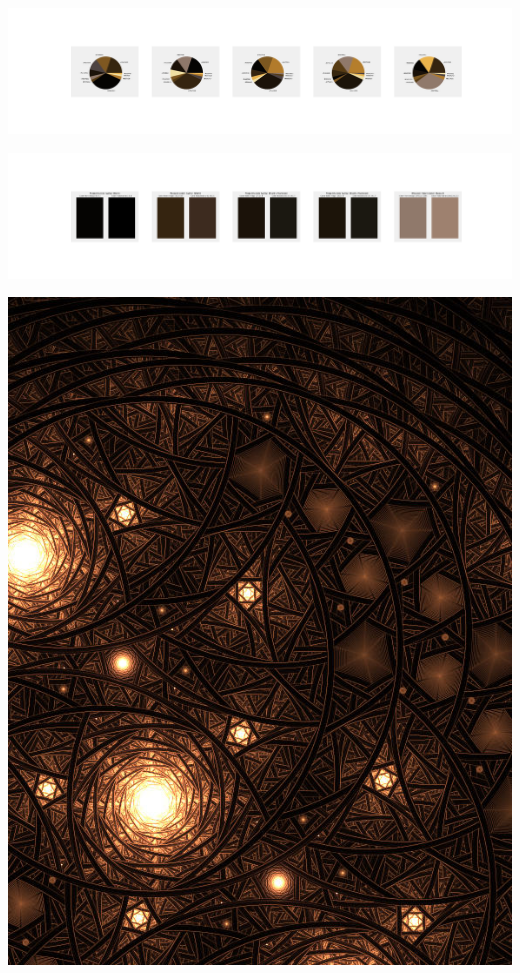\documentclass[11pt]{article}
\begin{document}
\begin{landscape}
    \begin{center}
    \includegraphics[width=250mm]{./nbimg/pie-402.jpg}
    \end{center}

    \begin{center}
    \includegraphics[width=250mm]{./nbimg/peak-402.jpg}
    \end{center}
    

    \begin{center}
    \includegraphics[width=\textwidth]{./nbimg/file (56).jpg}
    \end{center}


\end{landscape}
\end{document}
